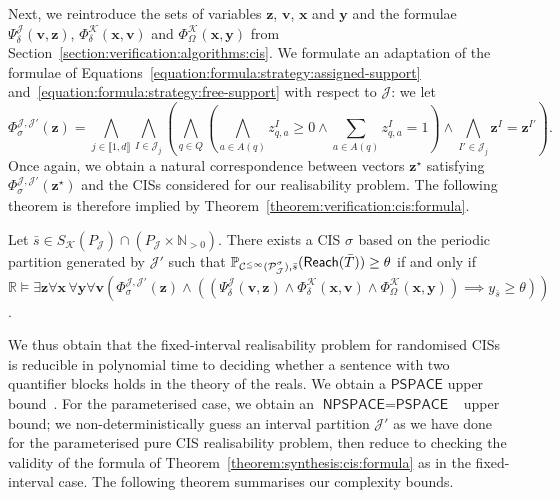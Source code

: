 \documentclass[a4paper,UKenglish,cleveref,autoref,thm-restate,colorlinks]{lipics-v2021}
\newcommand{\integerInterval}[1]{\llbracket{}#1\rrbracket{}}
\newcommand{\pspace}{\textsf{PSPACE}}
\newcommand{\npspace}{\textsf{NPSPACE}}
\newcommand{\IR}{\mathbb{R}}
\newcommand{\IN}{\mathbb{N}}
\newcommand{\INpos}{\IN_{>0}}
\newcommand{\mdpStateSpace}{S}
\newcommand{\ocStateSpace}{Q}
\newcommand{\ocState}{q}
\newcommand{\ocConfig}{s}
\newcommand{\ocActionSpace}{A}
\newcommand{\ocAction}{a}
\newcommand{\ocTrans}{\delta}
\newcommand{\mchain}{\mathcal{C}}
\newcommand{\ocChain}{\mathcal{P}}
\newcommand{\ocChainFin}[2]{\mchain^{\leq #2}(#1)}
\newcommand{\intPartB}{\mathcal{J}}
\newcommand{\intPartC}{\mathcal{K}}
\newcommand{\interval}{I}
\newcommand{\intNum}{d}
\newcommand{\intIndex}{j}
\newcommand{\cisChainStrat}[1]{\ocChain^{#1}_{\intPartB}}
\newcommand{\cisChain}{\cisChainStrat{\strat}}
\newcommand{\cisChainStateSpace}{P_{\intPartB}}
\newcommand{\compressCisStateSpace}{\mdpStateSpace_{\intPartC}({\cisChainStateSpace})}
\newcommand{\cisConfig}{\bar{\ocConfig}}
\newcommand{\varTrans}{x}
\newcommand{\varTransTuple}{\mathbf{\varTrans}}
\newcommand{\varObj}{y}
\newcommand{\varObjTuple}{\mathbf{\varObj}}
\newcommand{\varStrat}{z}
\newcommand{\varStratI}{\mathbf{\varStrat}^{\interval}}
\newcommand{\varStratIprime}{\mathbf{\varStrat}^{\interval'}}
\newcommand{\varStratTuple}{\mathbf{\varStrat}}
\newcommand{\solStratTuple}{\mathbf{\varStrat}^{\star}}
\newcommand{\varCis}{v}
\newcommand{\varCisTuple}{\mathbf{\varCis}}
\newcommand{\formulaTransBase}{\Phi_{\ocTrans}}
\newcommand{\formulaObjBase}{\Phi_{\objective}}
\newcommand{\formulaCisBase}{\Psi_{\ocTrans}}
\newcommand{\formulaStratBase}{\Phi_{\strat}}
\newcommand{\formulaCis}{\formulaCisBase^\intPartB}
\newcommand{\formulaCisTrans}{\formulaTransBase^\intPartC}
\newcommand{\formulaCisObj}{\formulaObjBase^\intPartC}
\newcommand{\formulaStratCis}{\formulaStratBase^{\intPartB,\intPartB'}}
\newcommand{\objective}{\Omega}
\newcommand{\reach}[1]{\mathsf{Reach}(#1)}
\newcommand{\target}{T}
\newcommand{\thresProba}{\theta}
\newcommand{\stratGeneric}[1]{{\sigma_{#1}}}
\newcommand{\strat}{\stratGeneric{}}
\begin{document}
Next, we reintroduce the sets of variables $\varStratTuple$, $\varCisTuple$, $\varTransTuple$ and $\varObjTuple$ and the formulae $\formulaCis(\varCisTuple, \varStratTuple)$, $\formulaCisTrans(\varTransTuple, \varCisTuple)$ and $\formulaCisObj(\varTransTuple, \varObjTuple)$ from Section~\ref{section:verification:algorithms:cis}.
We formulate an adaptation of the formulae of Equations~\eqref{equation:formula:strategy:assigned-support} and~\eqref{equation:formula:strategy:free-support} with respect to $\intPartB$: we let
\begin{equation}
  \formulaStratCis(\varStratTuple) =
  \bigwedge_{\intIndex\in\integerInterval{1, \intNum}}
  \bigwedge_{\interval\in\intPartB_\intIndex}
  \left(
  \bigwedge_{\ocState\in\ocStateSpace}\left(
    \bigwedge_{\ocAction\in\ocActionSpace(\ocState)}
      \varStrat_{\ocState,\ocAction}^{\interval} \geq 0\land
      \sum_{\ocAction\in\ocActionSpace(\ocState)}\varStrat_{\ocState,\ocAction}^{\interval} = 1
    \right)\land
    \bigwedge_{\interval'\in\intPartB_\intIndex}
    \varStratI = \varStratIprime
  \right).
\end{equation}
Once again, we obtain a natural correspondence between vectors $\solStratTuple$ satisfying $\formulaStratCis(\solStratTuple)$ and the CISs considered for our realisability problem.
The following theorem is therefore implied by Theorem~\ref{theorem:verification:cis:formula}.
\begin{theorem}\label{theorem:synthesis:cis:formula}
  Let $\cisConfig\in\compressCisStateSpace\cap(\cisChainStateSpace\times\INpos)$.
  There exists a CIS $\strat$ based on the periodic partition generated by $\intPartB'$ such that $\probaMCverb{\ocChainFin{\cisChain}{\infty}}{\cisConfig}(\reach{\bar{\target}})\geq\thresProba$ if and only if $\IR\models\exists\varStratTuple\forall\varTransTuple\,\forall\varObjTuple\forall\varCisTuple (\formulaStratCis(\varStratTuple)\land ((\formulaCis(\varCisTuple, \varStratTuple)\land\formulaCisTrans(\varTransTuple,\varCisTuple)\land\formulaCisObj(\varTransTuple, \varObjTuple))\implies \varObj_{\cisConfig}\geq\thresProba))$.
\end{theorem}

We thus obtain that the fixed-interval realisability problem for randomised CISs is reducible in polynomial time to deciding whether a sentence with two quantifier blocks holds in the theory of the reals.
We obtain a $\pspace$ upper bound~\cite[Rmk.~13.10]{BPR2006}.
For the parameterised case, we obtain an $\npspace = \pspace$~\cite{DBLP:journals/jcss/Savitch70} upper bound; we non-deterministically guess an interval partition $\intPartB'$ as we have done for the parameterised pure CIS realisability problem, then reduce to checking the validity of the formula of Theorem~\ref{theorem:synthesis:cis:formula} as in the fixed-interval case.
The following theorem summarises our complexity bounds.
\end{document}
